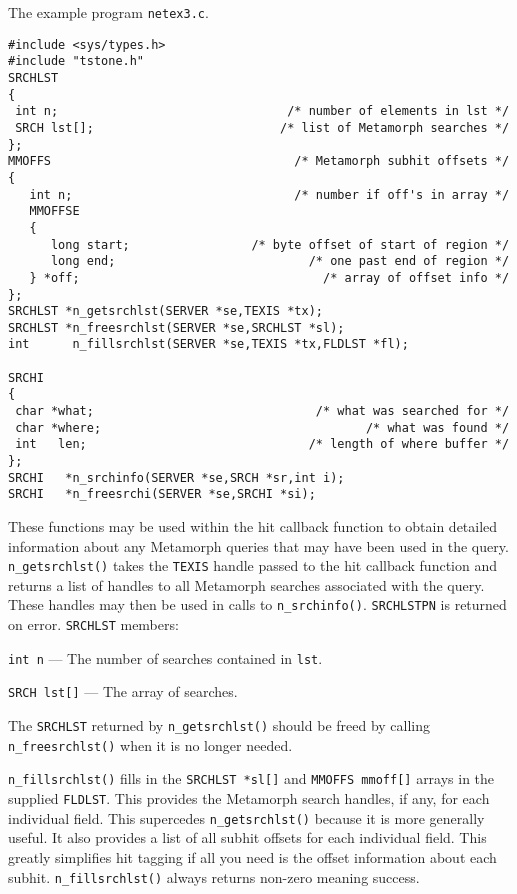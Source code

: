 \SEE
The example program \verb`netex3.c`.



\SYNOPSIS
\begin{verbatim}
#include <sys/types.h>
#include "tstone.h"
SRCHLST
{
 int n;                                /* number of elements in lst */
 SRCH lst[];                          /* list of Metamorph searches */
};
MMOFFS                                  /* Metamorph subhit offsets */
{
   int n;                               /* number if off's in array */
   MMOFFSE
   {
      long start;                 /* byte offset of start of region */
      long end;                           /* one past end of region */
   } *off;                                  /* array of offset info */
};
SRCHLST *n_getsrchlst(SERVER *se,TEXIS *tx);
SRCHLST *n_freesrchlst(SERVER *se,SRCHLST *sl);
int      n_fillsrchlst(SERVER *se,TEXIS *tx,FLDLST *fl);

SRCHI
{
 char *what;                               /* what was searched for */
 char *where;                                     /* what was found */
 int   len;                               /* length of where buffer */
};
SRCHI   *n_srchinfo(SERVER *se,SRCH *sr,int i);
SRCHI   *n_freesrchi(SERVER *se,SRCHI *si);
\end{verbatim}

\DESCRIPTION

These functions may be used within the hit callback function to obtain
detailed information about any Metamorph queries that may have been used
in the query.  \verb`n_getsrchlst()` takes the {\tt TEXIS} handle passed to
the hit callback function and returns a list of handles to all Metamorph
searches associated with the query.  These handles may then be used in
calls to \verb`n_srchinfo()`.  \verb`SRCHLSTPN` is returned on error.
\verb`SRCHLST` members:

\verb`int n` --- The number of searches contained in \verb`lst`.

\verb`SRCH lst[]` --- The array of searches.

The \verb`SRCHLST` returned by \verb`n_getsrchlst()` should be freed by
calling \verb`n_freesrchlst()` when it is no longer needed.

\verb`n_fillsrchlst()` fills in the \verb`SRCHLST *sl[]` and
\verb`MMOFFS mmoff[]` arrays in the supplied \verb`FLDLST`. This provides
the Metamorph search handles, if any, for each individual field. This
supercedes \verb`n_getsrchlst()` because it is more generally useful.
It also provides a list of all subhit offsets for each individual field.
This greatly simplifies hit tagging if all you need is the offset information
about each subhit. \verb`n_fillsrchlst()` always returns non-zero
meaning success.

